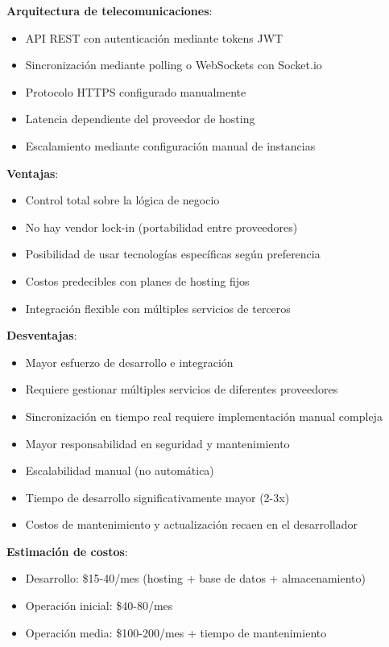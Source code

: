 \textbf{Arquitectura de telecomunicaciones}:
\begin{itemize}
    \item API REST con autenticación mediante tokens JWT
    \item Sincronización mediante polling o WebSockets con Socket.io
    \item Protocolo HTTPS configurado manualmente
    \item Latencia dependiente del proveedor de hosting
    \item Escalamiento mediante configuración manual de instancias
\end{itemize}

\textbf{Ventajas}:
\begin{itemize}
    \item Control total sobre la lógica de negocio
    \item No hay vendor lock-in (portabilidad entre proveedores)
    \item Posibilidad de usar tecnologías específicas según preferencia
    \item Costos predecibles con planes de hosting fijos
    \item Integración flexible con múltiples servicios de terceros
\end{itemize}

\textbf{Desventajas}:
\begin{itemize}
    \item Mayor esfuerzo de desarrollo e integración
    \item Requiere gestionar múltiples servicios de diferentes proveedores
    \item Sincronización en tiempo real requiere implementación manual compleja
    \item Mayor responsabilidad en seguridad y mantenimiento
    \item Escalabilidad manual (no automática)
    \item Tiempo de desarrollo significativamente mayor (2-3x)
    \item Costos de mantenimiento y actualización recaen en el desarrollador
\end{itemize}

\textbf{Estimación de costos}:
\begin{itemize}
    \item Desarrollo: \$15-40/mes (hosting + base de datos + almacenamiento)
    \item Operación inicial: \$40-80/mes
    \item Operación media: \$100-200/mes + tiempo de mantenimiento
\end{itemize}


